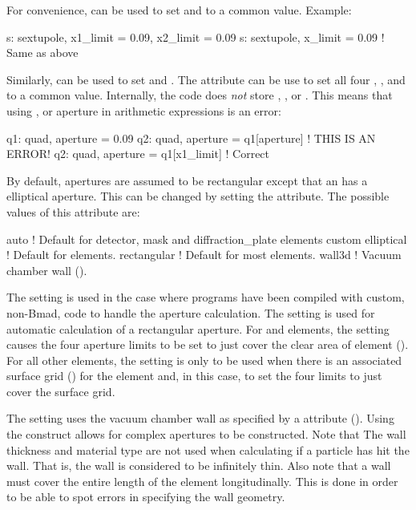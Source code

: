 For convenience,  can be used to set  and
 to a common value. Example:
\begin{example}
  s: sextupole, x1_limit = 0.09, x2_limit = 0.09
  s: sextupole, x_limit = 0.09   ! Same as above
\end{example}
Similarly,  can be used
to set  and .  The  attribute
can be use to set all four , , 
and  to a common value. Internally, the \bmad code does {\em not}
store , , or . This means that
using ,  or aperture in arithmetic expressions is
an error:
\begin{example}
  q1: quad, aperture = 0.09         
  q2: quad, aperture = q1[aperture]   ! THIS IS AN ERROR!
  q2: quad, aperture = q1[x1_limit]   ! Correct
\end{example}

By default, apertures are assumed to be rectangular except that an  has a elliptical
aperture. This can be changed by setting the  attribute. The possible values of
this attribute are:
\begin{example}
  auto         ! Default for detector, mask and diffraction_plate elements
  custom
  elliptical   ! Default for  elements.
  rectangular  ! Default for most elements.
  wall3d       ! Vacuum chamber wall ().
\end{example}
The  setting is used in the case where programs have been compiled with custom, non-Bmad,
code to handle the aperture calculation.  The  setting is used for automatic calculation of
a rectangular aperture. For  and  elements, the  setting
causes the four aperture limits to be set to just cover the clear area of element
(). For all other elements, the  setting is only to be used when there
is an associated surface grid () for the element and, in this case, \bmad to set
the four limits to just cover the surface grid.

The  setting uses the vacuum chamber wall as specified by a  attribute
(). Using the  construct allows for complex apertures to be
constructed. Note that The wall thickness and material type are not used when calculating
if a particle has hit the wall. That is, the wall is considered to be infinitely thin.
Also note that a wall must cover the entire length of the element longitudinally. This is done
in order to be able to spot errors in specifying the wall geometry.

